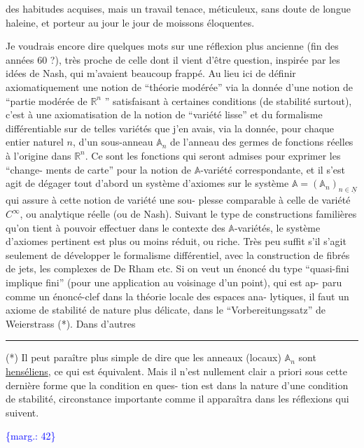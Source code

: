 \documentclass[11pt]{article}
\newcommand{\scanpage}[1]{\par\bigskip\noindent{\small\sffamily[scan #1]}\par}
\newcommand{\mspage}[1]{{\small\sffamily[p.\,#1]}}
\newcommand{\margin}[1]{\textcolor{blue}{\{\textsf{marg.:} #1\}}}
\newcommand{\uline}[1]{\underline{#1}}
\begin{document}
des habitudes acquises, mais un travail tenace, méticuleux, sans
doute de longue haleine, et porteur au jour le jour de moissons
éloquentes.

Je voudrais encore dire quelques mots sur une réflexion
plus ancienne (fin des années 60 ?), très proche de celle dont il
vient d'être question, inspirée par les idées de Nash, qui m'avaient
beaucoup frappé. Au lieu ici de définir axiomatiquement une notion
de ``théorie modérée'' via la donnée d'une notion de ``partie modérée
de $\mathbb{R}^n$ '' satisfaisant à certaines conditions (de stabilité surtout),
c'est à une axiomatisation de la notion de ``variété lisse'' et du
formalisme différentiable sur de telles variétés que j'en avais,
via la donnée, pour chaque entier naturel $n$, d'un sous-anneau
$\mathbb{A}_n$ de l'anneau des germes de fonctions réelles à l'origine dans $\mathbb{R}^n$.
Ce sont les fonctions qui seront admises pour exprimer les ``change-%
ments de carte'' pour la notion de $\mathbb{A}$-variété correspondante, et il
s'est agit de dégager tout d'abord un système d'axiomes sur le
système $\mathbb{A} = (\mathbb{A}_n)_{n\in\underline{N}}$ qui assure à cette notion de variété une sou-%
plesse comparable à celle de variété $C^\infty$, ou analytique réelle
(ou de Nash). Suivant le type de constructions familières qu'on
tient à pouvoir effectuer dans le contexte des $\mathbb{A}$-variétés, le
système d'axiomes pertinent est plus ou moins réduit, ou riche.
Très peu suffit s'il s'agit seulement de développer le formalisme
différentiel, avec la construction de fibrés de jets, les complexes
de De Rham etc. Si on veut un énoncé du type ``quasi-fini implique
fini'' (pour une application au voisinage d'un point), qui est ap-%
paru comme un énoncé-clef dans la théorie locale des espaces ana-%
lytiques, il faut un axiome de stabilité de nature plus délicate,
dans le ``Vorbereitungssatz'' de Weierstrass (*). Dans d'autres

\rule{4cm}{0.4pt}

(*) Il peut paraître plus simple de dire que les anneaux (locaux)
$\mathbb{A}_n$ sont \uline{henséliens}, ce qui est équivalent. Mais il n'est nullement
clair a priori sous cette dernière forme que la condition en ques-%
tion est dans la nature d'une condition de stabilité, circonstance
importante comme il apparaîtra dans les réflexions qui suivent.

\margin{42}

\clearpage
\scanpage{119/43}
\mspage{41}
\end{document}
